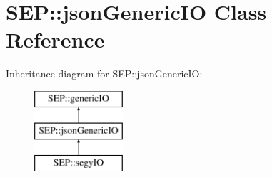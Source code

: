 \hypertarget{class_s_e_p_1_1json_generic_i_o}{}\section{S\+EP\+:\+:json\+Generic\+IO Class Reference}
\label{class_s_e_p_1_1json_generic_i_o}
Inheritance diagram for S\+EP\+:\+:json\+Generic\+IO\+:\begin{figure}[H]
\begin{center}
\leavevmode
\includegraphics[height=3.000000cm]{class_s_e_p_1_1json_generic_i_o}
\end{center}
\end{figure}
